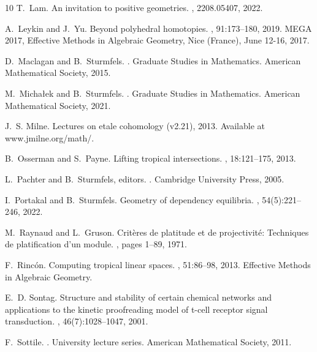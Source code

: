 \documentclass{article}
\theoremstyle{definition}
\begin{document}
{\begin{thebibliography}{10}
T.~Lam.
\newblock An invitation to positive geometries.
, 2208.05407, 2022.

A.~Leykin and J.~Yu.
\newblock Beyond polyhedral homotopies.
, 91:173--180, 2019.
\newblock MEGA 2017, Effective Methods in Algebraic Geometry, Nice (France), June 12-16, 2017.

D.~Maclagan and B.~Sturmfels.
.
\newblock Graduate Studies in Mathematics. American Mathematical Society, 2015.

M.~Micha{\l}ek and B.~Sturmfels.
.
\newblock Graduate Studies in Mathematics. American Mathematical Society, 2021.

J.~S. Milne.
\newblock Lectures on etale cohomology (v2.21), 2013.
\newblock Available at www.jmilne.org/math/.

B.~Osserman and S.~Payne.
\newblock Lifting tropical intersections.
, 18:121--175, 2013.

L.~Pachter and B.~Sturmfels, editors.
.
\newblock Cambridge University Press, 2005.

I.~Portakal and B.~Sturmfels.
\newblock Geometry of dependency equilibria.
, 54(5):221--246, 2022.

M.~Raynaud and L.~Gruson.
\newblock Critères de platitude et de projectivité: Techniques de platification d'un module.
, pages 1--89, 1971.

F.~Rincón.
\newblock Computing tropical linear spaces.
, 51:86--98, 2013.
\newblock Effective Methods in Algebraic Geometry.

E.~D. Sontag.
\newblock Structure and stability of certain chemical networks and applications to the kinetic proofreading model of t-cell receptor signal transduction.
, 46(7):1028--1047, 2001.

F.~Sottile.
.
\newblock University lecture series. American Mathematical Society, 2011.


\end{thebibliography}}
\end{document}
